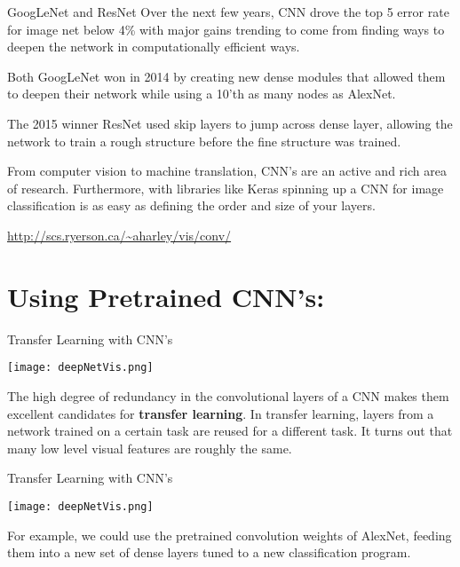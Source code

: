 \documentclass[10pt, table, dvipsnames,xcdraw, handout]{beamer}
\begin{document}
\begin{frame}[fragile]{GoogLeNet and ResNet}
Over the next few years, CNN drove the top 5 error rate for image net below 4\% with major gains trending to come from finding ways to deepen the network in computationally efficient ways. \pause\newline

Both GoogLeNet won in 2014 by creating new dense modules that allowed them to deepen their network while using a 10'th as many nodes as AlexNet. \pause\newline 

The 2015 winner ResNet used skip layers to jump across dense layer, allowing the network to train a rough structure before the fine structure was trained. \pause\newline

From computer vision to machine translation, CNN's are an active and rich area of research. Furthermore, with libraries like Keras spinning up a CNN for image classification is as easy as defining the order and size of your layers. 

\url{http://scs.ryerson.ca/~aharley/vis/conv/}
\end{frame}


\section{Using Pretrained CNN's:}


\begin{frame}[fragile]{Transfer Learning with CNN's}
  \begin{minipage}[t][0.4\textheight][t]{\textwidth}\centering
	\centering \texttt{[image: deepNetVis.png]}
  \end{minipage}
  \vfill
\begin{minipage}[t][0.6\textheight][t]{\textwidth}
The high degree of redundancy in the convolutional layers of a CNN makes them excellent candidates for \textbf{transfer learning}. In transfer learning, layers from a network trained on a certain task are reused for a different task. It turns out that many low level visual features are roughly the same. 
\end{minipage}
\end{frame}



\begin{frame}[fragile]{Transfer Learning with CNN's}
  \begin{minipage}[t][0.4\textheight][t]{\textwidth}\centering
	\centering \texttt{[image: deepNetVis.png]}
  \end{minipage}
  \vfill
\begin{minipage}[t][0.6\textheight][t]{\textwidth}
For example, we could use the pretrained convolution weights of AlexNet, feeding them into a new set of dense layers tuned to a new classification program. 
\end{minipage}
\end{frame}
\end{document}
